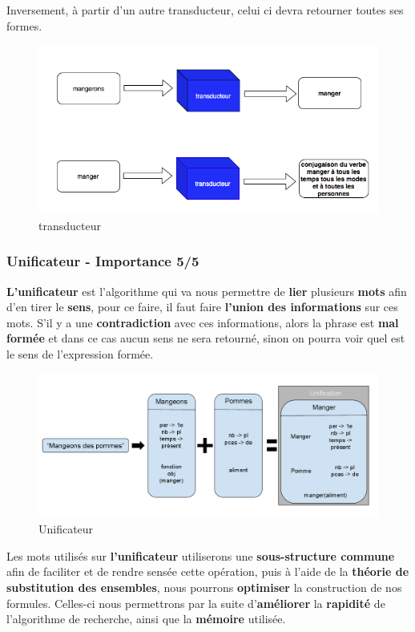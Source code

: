 {Inversement, à partir d'un autre transducteur, celui ci devra retourner toutes ses formes.}

\begin{figure}[ht]
    \centering
    \includegraphics[scale=0.5]{transducteur.png}
    \caption{transducteur }
\end{figure}

\subsubsection{Unificateur - Importance 5/5}{
\textbf{L'unificateur} est l'algorithme qui va nous permettre de \textbf{lier} plusieurs \textbf{mots} afin d'en tirer le \textbf{sens}, pour ce faire, il faut faire \textbf{l'union des informations} sur ces mots. S'il y a une \textbf{contradiction} avec ces informations, alors la phrase est \textbf{mal formée} et dans ce cas aucun sens ne sera retourné, sinon on pourra voir quel est le sens de l'expression formée.\par}

\begin{figure}[ht]
    \centering
    \includegraphics[scale=0.4]{unificateur.png}
    \caption{Unificateur }
\end{figure}

{Les mots utilisés sur \textbf{l'unificateur} utiliserons une \textbf{sous-structure commune} afin de faciliter et de rendre sensée cette opération, puis à l'aide de la \textbf{théorie de substitution des ensembles}, nous pourrons \textbf{optimiser} la construction de nos formules. Celles-ci nous permettrons par la suite d'\textbf{améliorer} la \textbf{rapidité} de l'algorithme de recherche, ainsi que la \textbf{mémoire} utilisée.\par}

